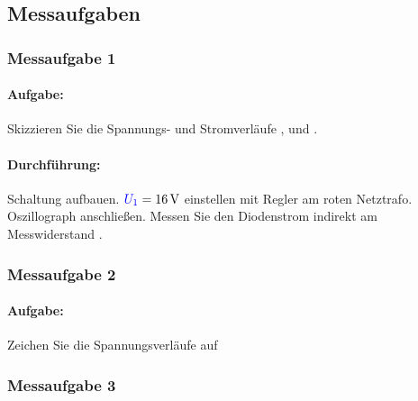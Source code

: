 \documentclass[11pt,a4paper,titlepage]{scrreprt}
\begin{document}
		\subsection{Messaufgaben}
			\subsubsection{Messaufgabe 1}
				\paragraph{Aufgabe:} Skizzieren Sie die Spannungs- und Stromverläufe ,  und .
				\paragraph{Durchführung:} Schaltung aufbauen. $\textcolor{blue}{U_1} = \SI{16}{\volt}$ einstellen mit Regler am roten Netztrafo. Oszillograph anschließen. Messen Sie den Diodenstrom  indirekt am Messwiderstand .

				
						
			\subsubsection{Messaufgabe 2}
                \paragraph{Aufgabe:} Zeichen Sie die Spannungsverläufe auf
            \subsubsection{Messaufgabe 3}
\end{document}
